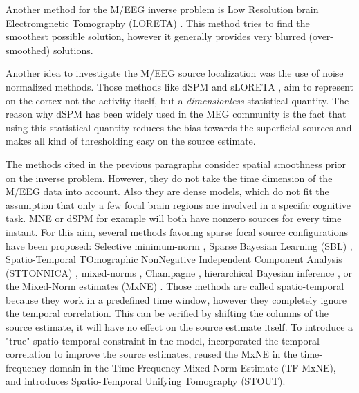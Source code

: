 Another method for the M/EEG inverse problem is Low Resolution brain Electromgnetic Tomography (LORETA) \cite{pascual1994low}. This method tries to find the smoothest possible solution, however it generally provides very blurred (over-smoothed) solutions.

Another idea to investigate the M/EEG source localization was the use of noise normalized methods. Those methods like dSPM \cite{dale2000dynamic} and sLORETA \cite{pascual2002standardized}, aim to represent on the cortex not the activity itself, but a \textit{dimensionless} statistical quantity. The reason why dSPM has been widely used in the MEG community is the fact that using this statistical quantity reduces the bias towards the superficial sources and makes all kind of thresholding easy on the source estimate.

The methods cited in the previous paragraphs consider spatial smoothness prior on the inverse problem. However, they do not take the time dimension of the M/EEG data into account. Also they are dense models, which do not fit the assumption that only a few focal brain regions are involved in a specific cognitive task. MNE or dSPM for example will both have nonzero sources for every time instant.
For this aim, several methods favoring sparse focal source configurations have been proposed: Selective minimum-norm \cite{matsuura1995selective}, Sparse Bayesian Learning (SBL) \cite{wipf2006bayesian}, Spatio-Temporal TOmographic NonNegative Independent Component Analysis (STTONNICA) \cite{valdes2009eeg}, mixed-norms \cite{ou2009distributed}, Champagne \cite{owen2012performance}, hierarchical Bayesian inference  \cite{lucka2012hierarchical}, or the Mixed-Norm estimates (MxNE) \cite{gramfort2012mixed}. Those methods are called spatio-temporal because they work in a predefined time window, however they completely ignore the temporal correlation. This can be verified by shifting the columns of the source estimate, it will have no effect on the source estimate itself. To introduce a "true" spatio-temporal constraint in the model, \cite{zhang2011sparse,zhang2011iterative} incorporated the temporal correlation to improve the source estimates, \cite{gramfort2013time} reused the MxNE in the time-frequency domain in the Time-Frequency Mixed-Norm Estimate (TF-MxNE), and \cite{castano2015solving} introduces Spatio-Temporal Unifying Tomography (STOUT).

